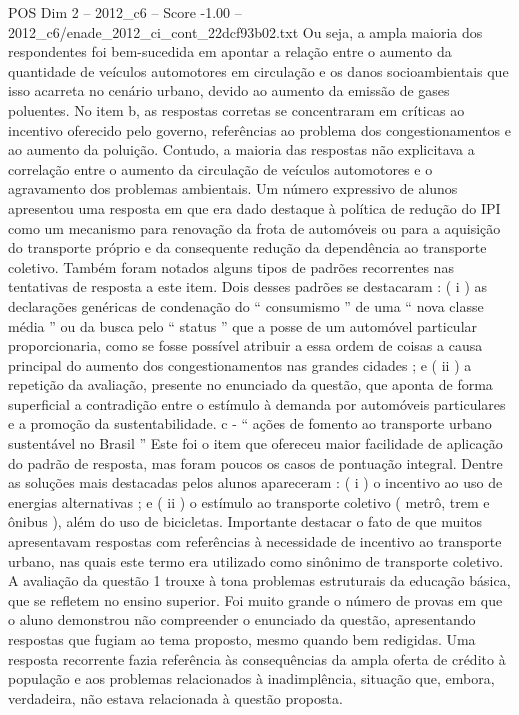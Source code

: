 \begin{textsample}{POS Dim 2 – 2012\_c6 – Score -1.00 – 2012\_c6/enade\_2012\_ci\_cont\_22dcf93b02.txt}
Ou seja, a ampla maioria dos respondentes foi bem-sucedida em apontar a relação entre o aumento da quantidade de veículos automotores em circulação e os danos socioambientais que isso acarreta no cenário urbano, devido ao aumento da emissão de gases poluentes.
No item b, as respostas corretas se concentraram em críticas ao incentivo oferecido pelo governo, referências ao problema dos congestionamentos e ao aumento da poluição.
Contudo, a maioria das respostas não explicitava a correlação entre o aumento da circulação de veículos automotores e o agravamento dos problemas ambientais.
Um número expressivo de alunos apresentou uma resposta em que era dado destaque à política de redução do IPI como um mecanismo para renovação da frota de automóveis ou para a aquisição do transporte próprio e da consequente redução da dependência ao transporte coletivo.
Também foram notados alguns tipos de padrões recorrentes nas tentativas de resposta a este item.
Dois desses padrões se destacaram : ( i ) as declarações genéricas de condenação do “ consumismo ” de uma “ nova classe média ” ou da busca pelo “ status ” que a posse de um automóvel particular proporcionaria, como se fosse possível atribuir a essa ordem de coisas a causa principal do aumento dos congestionamentos nas grandes cidades ; e ( ii ) a repetição da avaliação, presente no enunciado da questão, que aponta de forma superficial a contradição entre o estímulo à demanda por automóveis particulares e a promoção da sustentabilidade. c - “ ações de fomento ao transporte urbano sustentável no Brasil ” Este foi o item que ofereceu maior facilidade de aplicação do padrão de resposta, mas foram poucos os casos de pontuação integral.
Dentre as soluções mais destacadas pelos alunos apareceram : ( i ) o incentivo ao uso de energias alternativas ; e ( ii ) o estímulo ao transporte coletivo ( metrô, trem e ônibus ), além do uso de bicicletas.
Importante destacar o fato de que muitos apresentavam respostas com referências à necessidade de incentivo ao transporte urbano, nas quais este termo era utilizado como sinônimo de transporte coletivo.
A avaliação da questão 1 trouxe à tona problemas estruturais da educação básica, que se refletem no ensino superior.
Foi muito grande o número de provas em que o aluno demonstrou não compreender o enunciado da questão, apresentando respostas que fugiam ao tema proposto, mesmo quando bem redigidas.
Uma resposta recorrente fazia referência às consequências da ampla oferta de crédito à população e aos problemas relacionados à inadimplência, situação que, embora, verdadeira, não estava relacionada à questão proposta.

\end{textsample}
